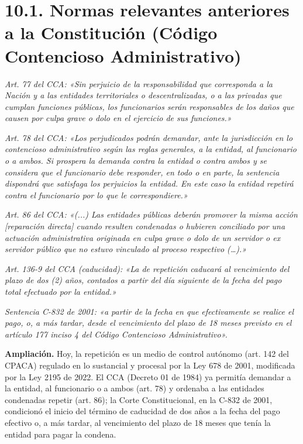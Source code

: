 
\section{10.1. Normas relevantes anteriores a la Constitución (Código Contencioso Administrativo)}
\begin{cita}
\textit{Art. 77 del CCA: «Sin perjuicio de la responsabilidad que corresponda a la Nación y a las entidades territoriales o descentralizadas, o a las privadas que cumplan funciones públicas, los funcionarios serán responsables de los daños que causen por culpa grave o dolo en el ejercicio de sus funciones.»}
\par
\textit{Art. 78 del CCA: «Los perjudicados podrán demandar, ante la jurisdicción en lo contencioso administrativo según las reglas generales, a la entidad, al funcionario o a ambos. Si prospera la demanda contra la entidad o contra ambos y se considera que el funcionario debe responder, en todo o en parte, la sentencia dispondrá que satisfaga los perjuicios la entidad. En este caso la entidad repetirá contra el funcionario por lo que le correspondiere.»}
\par
\textit{Art. 86 del CCA: «(...) Las entidades públicas deberán promover la misma acción [reparación directa] cuando resulten condenadas o hubieren conciliado por una actuación administrativa originada en culpa grave o dolo de un servidor o ex servidor público que no estuvo vinculado al proceso respectivo (…).»}
\par
\textit{Art. 136-9 del CCA (caducidad): «La de repetición caducará al vencimiento del plazo de dos (2) años, contados a partir del día siguiente de la fecha del pago total efectuado por la entidad.»}
\par
\textit{Sentencia C-832 de 2001: «a partir de la fecha en que efectivamente se realice el pago, o, a más tardar, desde el vencimiento del plazo de 18 meses previsto en el artículo 177 inciso 4 del Código Contencioso Administrativo».}
\end{cita}
\begin{ampliacion}
\textcolor[HTML]{5B3F8C}{\textbf{Ampliación. }}Hoy, la repetición es un medio de control autónomo (art. 142 del CPACA) regulado en lo sustancial y procesal por la Ley 678 de 2001, modificada por la Ley 2195 de 2022. El CCA (Decreto 01 de 1984) ya permitía demandar a la entidad, al funcionario o a ambos (art. 78) y ordenaba a las entidades condenadas repetir (art. 86); la Corte Constitucional, en la C-832 de 2001, condicionó el inicio del término de caducidad de dos años a la fecha del pago efectivo o, a más tardar, al vencimiento del plazo de 18 meses que tenía la entidad para pagar la condena.
\end{ampliacion}
